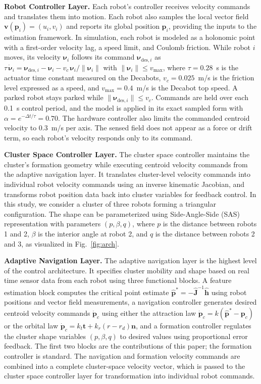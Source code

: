 \documentclass[10pt]{article}
\begin{document}
\textbf{Robot Controller Layer.} Each robot's controller receives velocity commands and translates them into motion. Each robot also samples the local vector field $\mathbf{v}(\mathbf{p}_i) = (u_i, v_i)$ and reports its global position $\mathbf{p}_i$, providing the inputs to the estimation framework. In simulation, each robot is modeled as a holonomic point with a first-order velocity lag, a speed limit, and Coulomb friction. While robot $i$ moves, its velocity $\boldsymbol{\nu}_i$ follows its command $\boldsymbol{\nu}_{\text{des},i}$ as $\tau\,\dot{\boldsymbol{\nu}}_i = \boldsymbol{\nu}_{\text{des},i} - \boldsymbol{\nu}_i - v_c\,\boldsymbol{\nu}_i/\|\boldsymbol{\nu}_i\|$ with $\|\boldsymbol{\nu}_i\| \le v_{\max}$, where $\tau = 0.28$~s is the actuator time constant measured on the Decabots, $v_c = 0.025$~m/s is the friction level expressed as a speed, and $v_{\max} = 0.4$~m/s is the Decabot top speed. A parked robot stays parked while $\|\boldsymbol{\nu}_{\text{des},i}\| \le v_c$. Commands are held over each 0.1~s control period, and the model is applied in its exact sampled form with $\alpha = e^{-\Delta t/\tau} = 0.70$. The hardware controller also limits the commanded centroid velocity to 0.3~m/s per axis. The sensed field does not appear as a force or drift term, so each robot's velocity responds only to its command.

\textbf{Cluster Space Controller Layer.} The cluster space controller maintains the cluster's formation geometry while executing centroid velocity commands from the adaptive navigation layer. It translates cluster-level velocity commands into individual robot velocity commands using an inverse kinematic Jacobian, and transforms robot position data back into cluster variables for feedback control. In this study, we consider a cluster of three robots forming a triangular configuration. The shape can be parameterized using Side-Angle-Side (SAS) representation with parameters $(p, \beta, q)$, where $p$ is the distance between robots 1 and 2, $\beta$ is the interior angle at robot 2, and $q$ is the distance between robots 2 and 3, as visualized in Fig.~\ref{fig:arch}.

\textbf{Adaptive Navigation Layer.} The adaptive navigation layer is the highest level of the control architecture. It specifies cluster mobility and shape based on real time sensor data from each robot using three functional blocks. A feature estimation block computes the critical point estimate $\hat{\mathbf{p}}^* = -\hat{\mathbf{J}}^{-1}\hat{\mathbf{h}}$ using robot positions and vector field measurements, a navigation controller generates desired centroid velocity commands $\dot{\mathbf{p}}_c$ using either the attraction law $\dot{\mathbf{p}}_c = k(\hat{\mathbf{p}}^* - \mathbf{p}_c)$ or the orbital law $\dot{\mathbf{p}}_c = k_t \mathbf{t} + k_r(r - r_d)\mathbf{n}$, and a formation controller regulates the cluster shape variables $(p, \beta, q)$ to desired values using proportional error feedback. The first two blocks are the contributions of this paper; the formation controller is standard. The navigation and formation velocity commands are combined into a complete cluster-space velocity vector, which is passed to the cluster space controller layer for transformation into individual robot commands.
\end{document}
